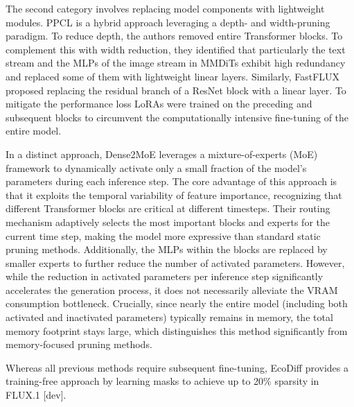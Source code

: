 The second category involves replacing model components with lightweight modules. PPCL \cite{PPCL} is a hybrid approach leveraging a depth- and width-pruning paradigm. To reduce depth, the authors removed entire Transformer blocks. To complement this with width reduction, they identified that particularly the text stream and the \gls{MLP}s of the image stream in \gls{MMDiT}s exhibit high redundancy and replaced some of them with lightweight linear layers. Similarly, FastFLUX \cite{FastFlux} proposed replacing the residual branch of a ResNet block with a linear layer. To mitigate the performance loss \gls{LoRA}s were trained on the preceding and subsequent blocks to circumvent the computationally intensive fine-tuning of the entire model.
 
 In a distinct approach, Dense2MoE \cite{Dense2MoE} leverages a mixture-of-experts (\gls{MoE}) framework to dynamically activate only a small fraction of the model's parameters during each inference step. The core advantage of this approach is that it exploits the temporal variability of feature importance, recognizing that different Transformer blocks are critical at different timesteps. Their routing mechanism adaptively selects the most important blocks and experts for the current time step, making the model more expressive than standard static pruning methods. Additionally, the \gls{MLP}s within the blocks are replaced by smaller experts to further reduce the number of activated parameters. However, while the reduction in activated parameters per inference step significantly accelerates the generation process, it does not necessarily alleviate the \gls{VRAM} consumption bottleneck. Crucially, since nearly the entire model (including both activated and inactivated parameters) typically remains in memory, the total memory footprint stays large, which distinguishes this method significantly from memory-focused pruning methods. 
 
 Whereas all previous methods require subsequent fine-tuning, EcoDiff \cite{EcoDiff} provides a training-free approach by learning masks to achieve up to 20\% sparsity in FLUX.1 [dev].
 
